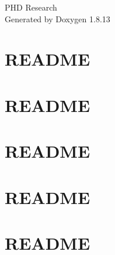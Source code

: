 \documentclass[twoside]{book}
\newcommand{\+}{\discretionary{\mbox{\scriptsize$\hookleftarrow$}}{}{}}
\newcommand{\clearemptydoublepage}{%
  \newpage{\pagestyle{empty}\cleardoublepage}%
}
\begin{document}
\hypersetup{pageanchor=false,
             bookmarksnumbered=true,
             pdfencoding=unicode
            }
\begin{titlepage}
\vspace*{7cm}
\begin{center}%
{\Large P\+HD Research }\\
\vspace*{1cm}
{\large Generated by Doxygen 1.8.13}\\
\end{center}
\end{titlepage}
\clearemptydoublepage
{}
\tableofcontents
\clearemptydoublepage
{}
\hypersetup{pageanchor=true}

\chapter{R\+E\+A\+D\+ME}
\label{md__application__s_w_e__r_e_a_d_m_e}

\chapter{R\+E\+A\+D\+ME}
\label{md__application__s_w_e__s_w_e2d__0D_s_w_e_conventional2d__r_e_a_d_m_e}

\chapter{R\+E\+A\+D\+ME}
\label{md__application__s_w_e__s_w_e2d__0D_s_w_e_pre_blanaced2d__r_e_a_d_m_e}

\chapter{R\+E\+A\+D\+ME}
\label{md__application__s_w_e__s_w_e2d__benchmark__channel_o_b_c__r_e_a_d_m_e}

\chapter{R\+E\+A\+D\+ME}
\label{md__r_e_a_d_m_e}

\end{document}

